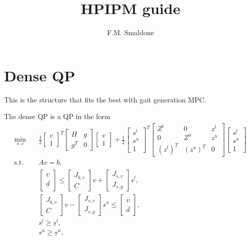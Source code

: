 \documentclass[a4paper]{article}
\title{HPIPM guide}
\author{F.M. Smaldone}
\begin{document}
\maketitle
\tableofcontents


\section{Dense QP}

This is the structure that fits the best with gait generation MPC.

The dense QP is a QP in the form
\begin{align*}
\min_{v,s} & \quad \frac 1 2 \begin{bmatrix} v \\ 1 \end{bmatrix}^T \begin{bmatrix} H & g \\ g^T & 0 \end{bmatrix} \begin{bmatrix} v \\ 1 \end{bmatrix} + \frac 1 2 \begin{bmatrix} s^l \\ s^u \\ 1 \end{bmatrix}^T \begin{bmatrix} Z^l & 0 & z^l \\ 0 & Z^u & z^u \\ (z^l)^T & (z^u)^T & 0 \end{bmatrix} \begin{bmatrix} s^l \\ s^u \\ 1 \end{bmatrix} \\
\text{s.t.} & \quad A v = b, \\
& \quad \begin{bmatrix} \underline v \\ \underline d \end{bmatrix} \leq \begin{bmatrix} J_{b,v} \\ C \end{bmatrix} v + \begin{bmatrix} J_{s,v} \\ J_{s,g} \end{bmatrix} s^l, \\
& \quad \begin{bmatrix} J_{b,v} \\ C \end{bmatrix} v - \begin{bmatrix} J_{s,v} \\ J_{s,g} \end{bmatrix} s^u \leq \begin{bmatrix} \overline v \\ \overline d \end{bmatrix}, \\
& \quad s^l\geq \underline s^l, \\
& \quad s^u\geq \underline s^u,
\end{align*}
\end{document}
